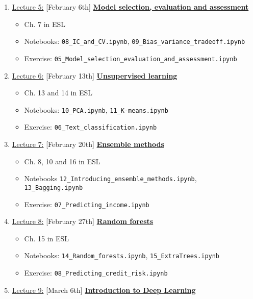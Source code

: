 \documentclass[12pt, a4paper]{article}
\begin{document}
\begin{enumerate}
{\begin{itemize}
          \end{itemize}
        }
  \item[] \underline{Lecture 5:} [February 6th] \underline{\bf Model selection, evaluation and assessment}
    {\small
      \begin{itemize}
        \item Ch. 7 in ESL
        \item Notebooks: \texttt{08\_IC\_and\_CV.ipynb}, \texttt{09\_Bias\_variance\_tradeoff.ipynb}
        \item Exercise: \texttt{05\_Model\_selection\_evaluation\_and\_assessment.ipynb}
      \end{itemize}
    }
  \item[] \underline{Lecture 6:} [February 13th] \underline{\bf Unsupervised learning}
    {\small
      \begin{itemize}
        \item Ch. 13 and 14 in ESL
        \item Notebooks: \texttt{10\_PCA.ipynb}, \texttt{11\_K-means.ipynb}
        \item Exercise: \texttt{06\_Text\_classification.ipynb}
      \end{itemize}
    }
  \item[] \underline{Lecture 7:} [February 20th] \underline{\bf Ensemble methods}
    {\small
      \begin{itemize}
        \item Ch. 8, 10 and  16 in ESL
        \item Notebooks \texttt{12\_Introducing\_ensemble\_methods.ipynb}, \texttt{13\_Bagging.ipynb}
        \item Exercise: \texttt{07\_Predicting\_income.ipynb}
      \end{itemize}
    }
  \item[] \underline{Lecture 8:} [February 27th] \underline{\bf Random forests}
    {\small
      \begin{itemize}
        \item Ch. 15 in ESL
        \item Notebooks: \texttt{14\_Random\_forests.ipynb}, \texttt{15\_ExtraTrees.ipynb}
        \item Exercise: \texttt{08\_Predicting\_credit\_risk.ipynb}
      \end{itemize}
    }
  \item[] \underline{Lecture 9:} [March 6th] \underline{\bf Introduction to Deep Learning}
    {\small
      \begin{itemize}

\end{itemize}}
\end{enumerate}
\end{document}
